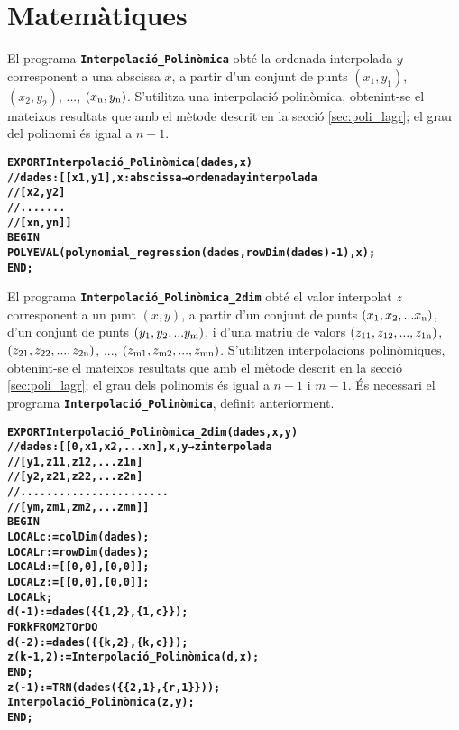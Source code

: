 \section{Matemàtiques}

El programa \texttt{\textbf{Interpolació\_Polinòmica}} obté la ordenada interpolada $y$ corresponent a una abscissa $x$, a partir d'un conjunt  de punts $(x_1,y_1)$, $(x_2,y_2)$, ..., $(x_\mathrm{n},y_\mathrm{n})$. S'utilitza una interpolació polinòmica, obtenint-se el mateixos resultats que amb el mètode descrit en la secció \vref{sec:poli_lagr}; el grau del polinomi és igual a $n-1$.
\vspace{-6mm}
\begin{alltt}
\bfseries
{}
    EXPORT Interpolació_Polinòmica(dades,x)
    // dades:[[x1,y1], x:abscissa → ordenada y interpolada
    //        [x2,y2]
    //        .......
    //        [xn,yn]]
    BEGIN
      POLYEVAL(polynomial_regression(dades,rowDim(dades)-1),x);
    END;
\end{alltt}


El programa \texttt{\textbf{Interpolació\_Polinòmica\_2dim}} obté el valor interpolat $z$ corresponent a un punt $(x, y)$, a partir d'un conjunt de punts $(x_\mathrm{1}, x_\mathrm{2}, ... x_\mathrm{n})$, d'un conjunt de punts $(y_\mathrm{1}, y_\mathrm{2}, ... y_\mathrm{m})$, i d'una matriu de valors $(z_\mathrm{11}, z_\mathrm{12}, ..., z_\mathrm{1n})$,
$(z_\mathrm{21}, z_\mathrm{22}, ..., z_\mathrm{2n})$, ..., $(z_\mathrm{m1}, z_\mathrm{m2}, ..., z_\mathrm{mn})$. S'utilitzen  interpolacions polinòmiques, obtenint-se el mateixos resultats que amb el mètode descrit en la secció \vref{sec:poli_lagr}; el grau dels polinomis és igual a $n-1$ i $m-1$.
És necessari el programa \texttt{\textbf{Interpolació\_Polinòmica}}, definit anteriorment.
\pagebreak
\begin{alltt}
\bfseries
{}
    EXPORT Interpolació_Polinòmica_2dim(dades,x,y)
    // dades:[[0,   x1,  x2, ...  xn], x, y → z interpolada
    //        [y1, z11, z12, ... z1n]
    //        [y2, z21, z22, ... z2n]
    //        .......................
    //        [ym, zm1, zm2, ... zmn]]
    BEGIN
      LOCAL c:=colDim(dades);
      LOCAL r:=rowDim(dades);
      LOCAL d:=[[0,0],[0,0]];
      LOCAL z:=[[0,0],[0,0]];
      LOCAL k;
      d(-1):=dades(\{\{1,2\},\{1,c\}\});
      FOR k FROM 2 TO r DO
        d(-2):=dades(\{\{k,2\},\{k,c\}\});
        z(k-1,2):=Interpolació_Polinòmica(d,x);
      END;
      z(-1):=TRN(dades(\{\{2,1\},\{r,1\}\}));
      Interpolació_Polinòmica(z,y);
    END;
\end{alltt}

